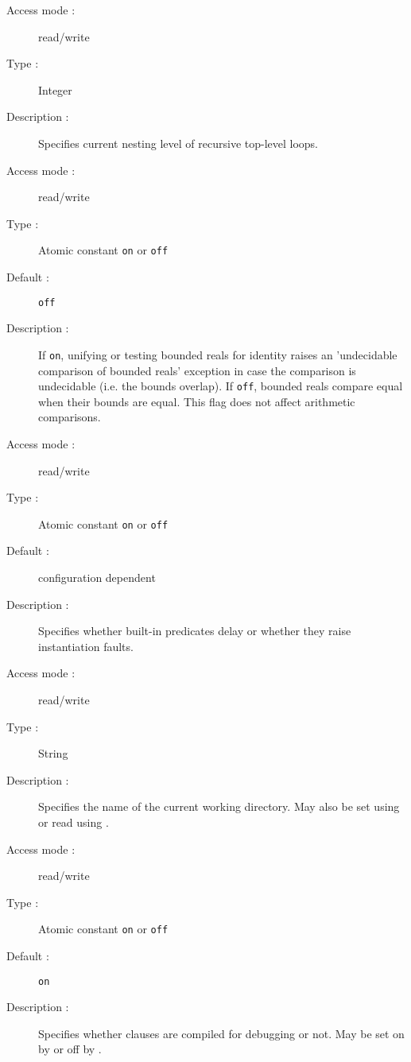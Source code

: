 \begin{description}

\begin{description}
\item[Access mode : ] read/write
\item[Type : ] Integer
\item[Description : ] Specifies current nesting level of recursive
top-level loops.
\end{description}

\begin{description}
\item[Access mode : ] read/write
\item[Type : ] Atomic constant {\tt on} or {\tt off}
\item[Default : ] {\tt off}
\item[Description : ]
If {\tt on},  unifying or testing bounded reals for identity raises
an 'undecidable comparison of bounded reals' exception in case the
comparison is undecidable (i.e. the bounds overlap).
If {\tt off}, bounded reals compare equal when their bounds
are equal. This flag does not affect arithmetic comparisons.
\end{description}

\begin{description}
\item[Access mode : ] read/write
\item[Type : ] Atomic constant {\tt on} or {\tt off} 
\item[Default : ] configuration dependent
\item[Description : ] Specifies whether built-in predicates delay or whether
they raise instantiation faults.
\end{description}

\begin{description}
\item[Access mode : ] read/write
\item[Type : ] String 
\item[Description : ] Specifies the name of the current working directory.
May also be set using  or read using .
\end{description}

\pagebreak[3]
\begin{description}
\item[Access mode : ] read/write 
\item[Type : ] Atomic constant {\tt on} or {\tt off} 
\item[Default : ] {\tt on}
\item[Description : ] Specifies whether clauses are compiled for debugging or 
not. May be set on by  or off by .
\end{description}


\end{description}
